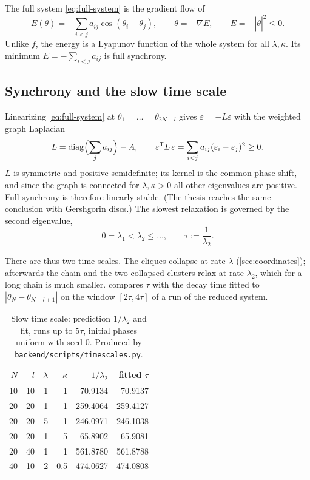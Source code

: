 \documentclass[a4paper,11pt]{article}
\newcommand{\code}[1]{\texttt{#1}}
\theoremstyle{remark}
\begin{document}
The full system \eqref{eq:full-system} is the gradient flow of
\begin{equation}\label{eq:energy}
E(\theta)=-\sum_{i<j}a_{ij}\cos(\theta_i-\theta_j),\qquad
\dot\theta=-\nabla E,\qquad \dot E=-|\dot\theta|^2\le0 .
\end{equation}
Unlike $f$, the energy is a Lyapunov function of the whole system for all
$\lambda,\kappa$. Its minimum $E=-\sum_{i<j}a_{ij}$ is full synchrony.

\subsection{Synchrony and the slow time scale}

Linearizing \eqref{eq:full-system} at $\theta_1=\dots=\theta_{2N+l}$ gives
$\dot\varepsilon=-L\varepsilon$ with the weighted graph Laplacian
\begin{equation}\label{eq:laplacian}
L=\operatorname{diag}\Bigl(\sum_j a_{ij}\Bigr)-A,\qquad
\varepsilon^{\mathsf T}L\,\varepsilon=\sum_{i<j}a_{ij}(\varepsilon_i-\varepsilon_j)^2\ge0 .
\end{equation}
$L$ is symmetric and positive semidefinite; its kernel is the common phase
shift, and since the graph is connected for $\lambda,\kappa>0$ all other
eigenvalues are positive. Full synchrony is therefore linearly stable. (The
thesis reaches the same conclusion with Gershgorin discs.) The slowest
relaxation is governed by the second eigenvalue,
\begin{equation}\label{eq:tau}
0=\lambda_1<\lambda_2\le\dots,\qquad \tau:=\frac{1}{\lambda_2} .
\end{equation}

There are thus two time scales. The cliques collapse at rate $\lambda$
(\cref{sec:coordinates}); afterwards the chain and the two collapsed clusters
relax at rate $\lambda_2$, which for a long chain is much smaller.
 compares $\tau$ with the decay time fitted to
$|\theta_N-\theta_{N+l+1}|$ on the window $[2\tau,4\tau]$ of a run of the
reduced system.

\begin{table}[ht]
\centering
\begin{tabular}{rrrrrr}
\toprule
$N$ & $l$ & $\lambda$ & $\kappa$ & $1/\lambda_2$ & fitted $\tau$\\
\midrule
10 & 10 & 1 & 1 & 70.9134 & 70.9137\\
20 & 20 & 1 & 1 & 259.4064 & 259.4127\\
20 & 20 & 5 & 1 & 246.0971 & 246.1038\\
20 & 20 & 1 & 5 & 65.8902 & 65.9081\\
20 & 40 & 1 & 1 & 561.8780 & 561.8788\\
40 & 10 & 2 & 0.5 & 474.0627 & 474.0808\\
\bottomrule
\end{tabular}
\caption{Slow time scale: prediction $1/\lambda_2$ and fit, runs up to $5\tau$,
initial phases uniform with seed $0$. Produced by \code{backend/scripts/timescales.py}.}
\label{tab:tau}
\end{table}
\end{document}
